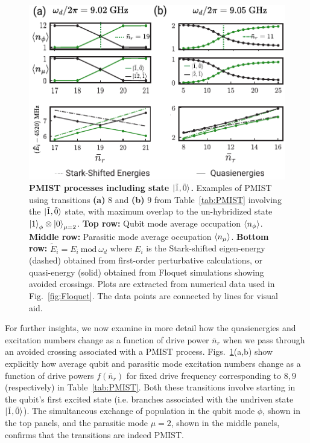 \documentclass[%
reprint,
superscriptaddress,
 amsmath,amssymb,
 aps,
 prx,
longbibliography,
floatfix,
]{revtex4-2}
\begin{document}
 \begin{figure}[t]
    \centering
    \includegraphics[width=\linewidth]{Figures/Floquet_011.pdf}
    \caption{{\bf PMIST processes including state $\ket{\tilde{1},\tilde{0}}$.} Examples of PMIST using transitions \textbf{(a)} $8$ and \textbf{(b)} $9$ from Table~\ref{tab:PMIST} involving the $\ket{\tilde{1},\tilde{0}}$ state, with maximum overlap to the un-hybridized state $\ket{1}_\phi\otimes\ket{0}_{\mu=2}$. \textbf{Top row:} Qubit mode average occupation $\braket{n_\phi}$. \textbf{Middle row:} Parasitic mode average occupation $\braket{n_\mu}$. \textbf{Bottom row:} $\tilde{E}_i=E_i \ \textrm{mod} \ \omega_d$ where $E_i$ is the Stark-shifted eigen-energy (dashed) obtained from first-order perturbative calculations, or quasi-energy (solid) obtained from Floquet simulations showing avoided crossings. Plots are extracted from numerical data used in Fig.~\ref{fig:Floquet}. The data points are connected by lines for visual aid.}
    \label{fig:011}
\end{figure}

For further insights, we now examine in more detail how the quasienergies and excitation numbers change as a function of drive power $\bar{n}_r$ when we pass through an avoided crossing associated with a PMIST process. Figs.~\ref{fig:011}(a,b) show explicitly how average qubit and parasitic mode excitation numbers change as a function of drive powers $f(\bar n_r)$ for fixed drive frequency corresponding to $8,9$ (respectively) in Table~\ref{tab:PMIST}.  Both these transitions involve starting in the qubit's first excited state (i.e. branches associated with the undriven state $\ket{\tilde{1},\tilde{0}}$). The simultaneous exchange of population in the qubit mode $\phi$, shown in the top panels, and the parasitic mode $\mu=2$, shown in the middle panels, confirms that the transitions are indeed PMIST. 
\end{document}
